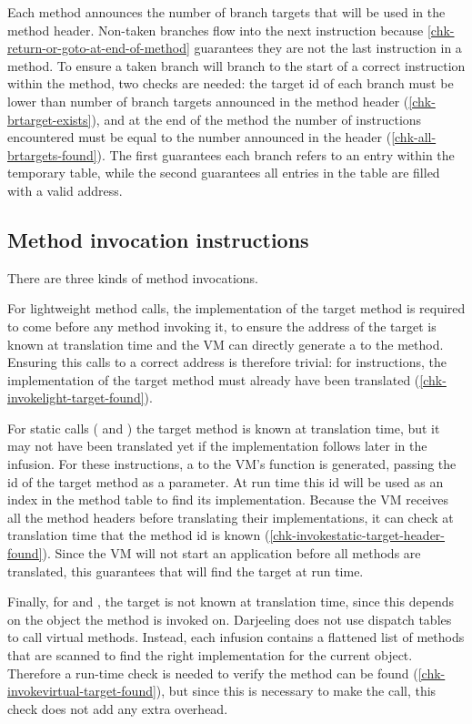 Each method announces the number of branch targets that will be used in the method header. Non-taken branches flow into the next instruction because \ref{chk-return-or-goto-at-end-of-method} guarantees they are not the last instruction in a method. To ensure a taken branch will branch to the start of a correct instruction within the method, two checks are needed: the target id of each branch must be lower than number of branch targets announced in the method header (\ref{chk-brtarget-exists}), and at the end of the method the number of  instructions encountered must be equal to the number announced in the header (\ref{chk-all-brtargets-found}). The first guarantees each branch refers to an entry within the temporary table, while the second guarantees all entries in the table are filled with a valid address.

\subsection{Method invocation instructions}
There are three kinds of method invocations.

For lightweight method calls, the implementation of the target method is required to come before any method invoking it, to ensure the address of the target is known at translation time and the VM can directly generate a  to the method. Ensuring this calls to a correct address is therefore trivial: for  instructions, the implementation of the target method must already have been translated (\ref{chk-invokelight-target-found}).

For static calls ( and ) the target method is known at translation time, but it may not have been translated yet if the implementation follows later in the infusion. For these instructions, a  to the VM's  function is generated, passing the id of the target method as a parameter. At run time this id will be used as an index in the method table to find its implementation. Because the VM receives all the method headers before translating their implementations, it can check at translation time that the method id is known (\ref{chk-invokestatic-target-header-found}). Since the VM will not start an application before all methods are translated, this guarantees that  will find the target at run time.

Finally, for  and , the target is not known at translation time, since this depends on the object the method is invoked on. Darjeeling does not use dispatch tables to call virtual methods. Instead, each infusion contains a flattened list of methods that are scanned to find the right implementation for the current object. Therefore a run-time check is needed to verify the method can be found (\ref{chk-invokevirtual-target-found}), but since this is necessary to make the call, this check does not add any extra overhead.

